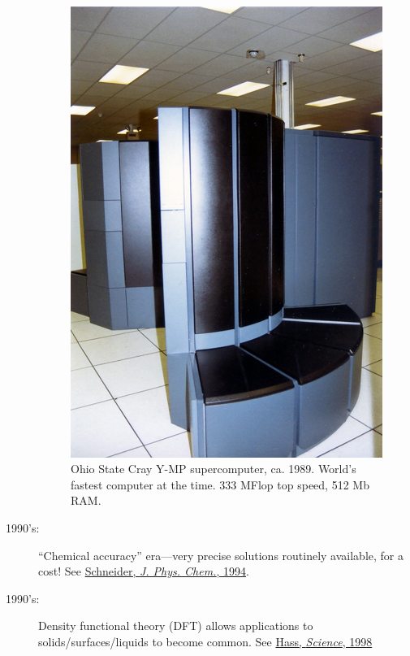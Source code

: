 \documentclass[12pt]{article}
\begin{document}
\begin{description}
\begin{figure}[h]
  \centering
  \includegraphics[scale=0.1]{./Cray_Y-MPb.jpg}
  \caption{Ohio State Cray Y-MP supercomputer, ca. 1989.  World's
    fastest computer at the time.  333 MFlop top speed, 512 Mb RAM.}
\end{figure}

\item[1990's:] ``Chemical accuracy'' era---very precise solutions routinely
available, for a cost!  See
\href{http://www.crc.nd.edu/~wschnei1/courses/CBE_547/Resources/1994_WFS_JPC.pdf}{Schneider,
{\em J. Phys. Chem.}, 1994}.

\item[1990's:] Density functional theory (DFT) allows applications to
  solids/surfaces/liquids to become common. See
\href{http://www.crc.nd.edu/~wschnei1/courses/CBE_547/Resources/1998_Hass_Science.pdf}{Hass,
  {\em Science}, 1998}


\end{description}
\end{document}
